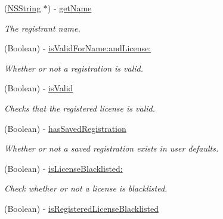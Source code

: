 \begin{DoxyCompactItemize}
(\hyperlink{class_n_s_string}{NSString} $\ast$) -\/ \hyperlink{interface_g_d_registration_a748a7113b6adcf0337c820aa56bb01ed}{getName}
\begin{DoxyCompactList}\small\item\em The registrant name. \item\end{DoxyCompactList}\item 
(Boolean) -\/ \hyperlink{interface_g_d_registration_aff2e80860b72d462954323dd0203834f}{isValidForName:andLicense:}
\begin{DoxyCompactList}\small\item\em Whether or not a registration is valid. \item\end{DoxyCompactList}\item 
(Boolean) -\/ \hyperlink{interface_g_d_registration_a172ffae07aff61343bf35bd93d50d9f2}{isValid}
\begin{DoxyCompactList}\small\item\em Checks that the registered license is valid. \item\end{DoxyCompactList}\item 
\hypertarget{interface_g_d_registration_aee73dceb1eb6c134f2a3a6dbfdd682d4}{
(Boolean) -\/ \hyperlink{interface_g_d_registration_aee73dceb1eb6c134f2a3a6dbfdd682d4}{hasSavedRegistration}}
\label{interface_g_d_registration_aee73dceb1eb6c134f2a3a6dbfdd682d4}

\begin{DoxyCompactList}\small\item\em Whether or not a saved registration exists in user defaults. \item\end{DoxyCompactList}\item 
(Boolean) -\/ \hyperlink{interface_g_d_registration_a4b3b036fb9260a31cc1eca5bb436d27e}{isLicenseBlacklisted:}
\begin{DoxyCompactList}\small\item\em Check whether or not a license is blacklisted. \item\end{DoxyCompactList}\item 
\hypertarget{interface_g_d_registration_a1f2a4f7f7d77a633ea6348813a2596ea}{
(Boolean) -\/ \hyperlink{interface_g_d_registration_a1f2a4f7f7d77a633ea6348813a2596ea}{isRegisteredLicenseBlacklisted}}
\label{interface_g_d_registration_a1f2a4f7f7d77a633ea6348813a2596ea}


\end{DoxyCompactItemize}
